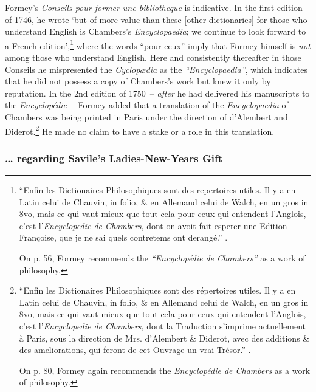 \documentclass[output=paper]{langscibook}
\begin{document}
Formey’s \emph{Conseils pour former une bibliotheque} is indicative. In the first edition of 1746, he wrote ‘but of more value than these [other dictionaries] for those who understand English is Chambers’s \emph{Encyclopaedia}; we continue to look forward to a French edition’,\footnote{“Enfin les Dictionaires Philosophiques sont des repertoires utiles. Il y a en Latin celui de Chauvin, in folio, \& en Allemand celui de Walch, en un gros in 8vo, mais ce qui vaut mieux que tout cela pour ceux qui entendent l’Anglois, c’est l’\emph{Encyclopedie de Chambers}, dont on avoit fait esperer une Edition Françoise, que je ne sai quels contretems ont derangé.” \citep[13]{Formey1746}.

On p. 56, Formey recommends the \emph{“Encyclopédie de Chambers”} as a work of philosophy.}  where the words “pour ceux” imply that Formey himself is \emph{not} among those who understand English. Here and consistently thereafter in those Conseils he mispresented the \emph{Cyclopædia} as the \emph{“Encyclopaedia”}, which indicates that he did not possess a copy of Chambers’s work but knew it only by reputation. In the 2nd edition of 1750~-- \emph{after} he had delivered his manuscripts to the \emph{Encyclopédie}~-- Formey added that a translation of the \emph{Encyclopaedia} of Chambers was being printed in Paris under the direction of d’Alembert and Diderot.\footnote{“Enfin les Dictionaires Philosophiques sont des répertoires utiles. Il y a en Latin celui de Chauvin, in folio, \& en Allemand celui de Walch, en un gros in 8vo, mais ce qui vaut mieux que tout cela pour ceux qui entendent l’Anglois, c’est l’\emph{Encyclopedie de Chambers}, dont la Traduction s’imprime actuellement à Paris, sous la direction de Mrs. d’Alembert \& Diderot, avec des additions \& des ameliorations, qui feront de cet Ouvrage un vrai Trésor.” \citep[18]{Formey1750}.

On p. 80, Formey again recommends the \emph{Encyclopédie de Chambers} as a work of philosophy.} He made no claim to have a stake or a role in this translation.

\subsubsection{… regarding Savile’s Ladies-New-Years Gift}
\end{document}
